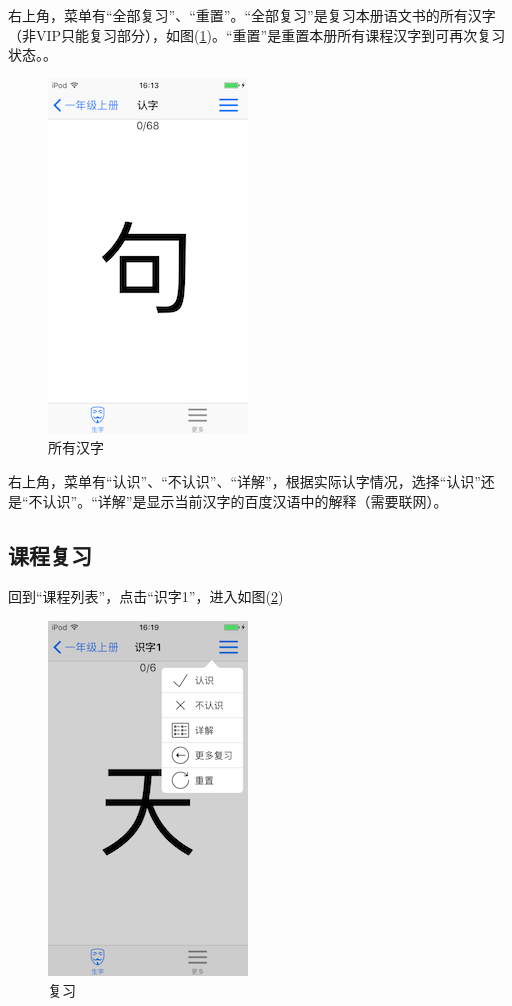 右上角，菜单有“全部复习”、“重置”。“全部复习”是复习本册语文书的所有汉字（非VIP只能复习部分），如图(\ref{img5})。“重置”是重置本册所有课程汉字到可再次复习状态。。
\begin{figure}[H]
	\centering
	\includegraphics{img/5.png}
	\caption{所有汉字}
	\label{img5}
\end{figure}

右上角，菜单有“认识”、“不认识”、“详解”，根据实际认字情况，选择“认识”还是“不认识”。“详解”是显示当前汉字的百度汉语中的解释（需要联网）。\\

\subsection{课程复习}
回到“课程列表”，点击“识字1”，进入如图(\ref{img6})
\begin{figure}[H]
	\centering
	\includegraphics{img/6.png}
	\caption{复习}
	\label{img6}
\end{figure}

